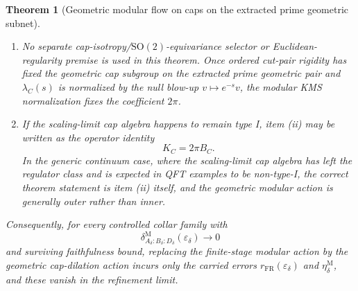 \documentclass[11pt]{article}
\newtheorem{theorem}{Theorem}[section]
\begin{document}
\begin{theorem}[Geometric modular flow on caps on the extracted prime geometric subnet]
\begin{enumerate}[label=\textup{(\roman*)},leftmargin=2em]
\item No separate cap-isotropy/\(\mathrm{SO}(2)\)-equivariance selector or Euclidean-regularity premise is used in this theorem. Once ordered cut-pair rigidity has fixed the geometric cap subgroup on the extracted prime geometric pair and \(\lambda_C(s)\) is normalized by the null blow-up \(v\mapsto e^{-s}v\), the modular KMS normalization fixes the coefficient \(2\pi\).

\item If the scaling-limit cap algebra happens to remain type I, item \textup{(ii)} may be written as the operator identity
\[
K_C=2\pi B_C.
\]
In the generic continuum case, where the scaling-limit cap algebra has left the regulator class and is expected in QFT examples to be non-type-I, the correct theorem statement is item \textup{(ii)} itself, and the geometric modular action is generally outer rather than inner.
\end{enumerate}

Consequently, for every controlled collar family with
\[
\delta^{\mathrm M}_{A_\delta:B_\delta:D_\delta}(\varepsilon_\delta)\to 0
\]
and surviving faithfulness bound, replacing the finite-stage modular action by the geometric cap-dilation action incurs only the carried errors \(r_{\mathrm{FR}}(\varepsilon_\delta)\) and \(\eta_\delta^{\mathrm M}\), and these vanish in the refinement limit.
\end{theorem}
\end{document}
